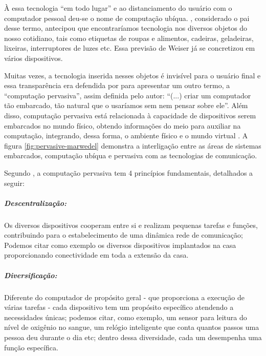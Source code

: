 À essa tecnologia ``em todo lugar'' e ao distanciamento do usuário com o
computador pessoal deu-se o nome de computação ubíqua.
, considerado o pai desse termo, antecipou que
encontraríamos tecnologia nos diversos objetos do nosso cotidiano, tais como
etiquetas de roupas e alimentos, cadeiras, geladeiras, lixeiras, interruptores
de luzes etc. Essa previsão de Weiser já se concretizou em vários dispositivos.


Muitas vezes, a tecnologia inserida nesses objetos é invisível para o usuário
final e essa transparência era defendida por  para
apresentar um outro termo, a ``computação pervasiva'', assim definida pelo
autor: ``(...) criar  um computador tão embarcado, tão natural que o usaríamos
sem nem pensar sobre ele''. Além disso, computação pervasiva está relacionada à
capacidade de dispositivos serem embarcados no mundo físico, obtendo
informações do meio para auxiliar na computação, integrando, dessa forma, o
ambiente físico e o mundo virtual \cite{bolsoni2009computaccao,
de2003computaccao}. A figura  \ref{fig:pervasive-marwedel} demonstra a
interligação entre as áreas de sistemas embarcados, computação ubíqua e
pervasiva com as tecnologias de comunicação.

Segundo , a computação pervasiva tem 4 princípios 
fundamentais, detalhados a seguir: 

\subparagraph{Descentralização:} 

Os diversos dispositivos cooperam entre si e realizam
pequenas tarefas e funções, contribuindo para o estabelecimento de uma 
dinâmica rede de comunicação; Podemos citar como exemplo os diversos 
dispositivos implantados na casa proporcionando conectividade em toda
a extensão da casa.

\subparagraph{Diversificação:} 

Diferente do computador de propósito geral - que 
proporciona a execução de várias tarefas - cada dispositivo tem um propósito
específico atendendo a necessidades únicas; podemos citar, como exemplo, um
sensor para leitura do nível de oxigênio no sangue, um relógio inteligente
que conta quantos passos uma pessoa deu durante o dia etc; dentro dessa 
diversidade, cada um desempenha uma função específica.

